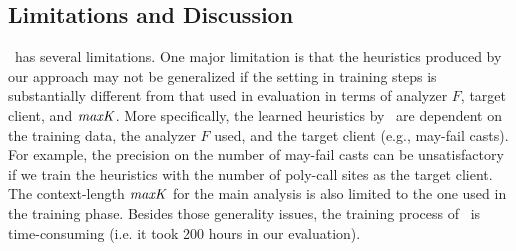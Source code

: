 




\subsection{Limitations and Discussion}
\ourtool~has several limitations.
One major limitation is that the heuristics produced by our approach may not be generalized
if the setting in training steps is substantially different from that used in evaluation in terms of analyzer $F$, target client, and ${\it maxK}$.
More specifically, the learned heuristics by \ourtool~are dependent on the training data, the analyzer $F$ used, and the target client
(e.g., may-fail casts).
For example, the precision on the number of may-fail casts can be unsatisfactory if we train the heuristics with
the number of poly-call sites as the target client.
The context-length ${\it maxK}$ for the main analysis is also limited to the one used in the training phase.
Besides those generality issues, the training process of \ourtool~is time-consuming (i.e. it took 200 hours in our evaluation).


